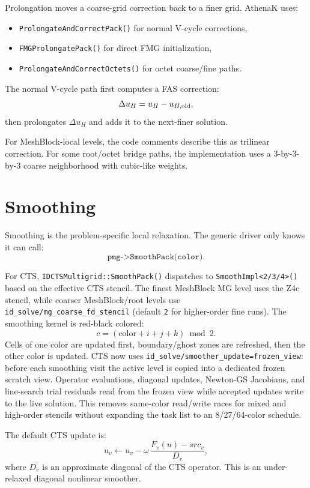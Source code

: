 \documentclass[11pt]{article}
\newcommand{\code}[1]{\texttt{#1}}
\begin{document}
Prolongation moves a coarse-grid correction back to a finer grid.  AthenaK uses:
\begin{itemize}
  \item \code{ProlongateAndCorrectPack()} for normal V-cycle corrections,
  \item \code{FMGProlongatePack()} for direct FMG initialization,
  \item \code{ProlongateAndCorrectOctets()} for octet coarse/fine paths.
\end{itemize}

The normal V-cycle path first computes a FAS correction:
\[
  \Delta u_H = u_H - u_{H,{\rm old}},
\]
then prolongates \(\Delta u_H\) and adds it to the next-finer solution.

For MeshBlock-local levels, the code comments describe this as trilinear
correction.  For some root/octet bridge paths, the implementation uses a
3-by-3-by-3 coarse neighborhood with cubic-like weights.

\section{Smoothing}

Smoothing is the problem-specific local relaxation.  The generic driver only
knows it can call:
\[
  \code{pmg->SmoothPack(color)}.
\]

For CTS, \code{IDCTSMultigrid::SmoothPack()} dispatches to
\code{SmoothImpl<2/3/4>()} based on the effective CTS stencil.  The finest
MeshBlock MG level uses the Z4c stencil, while coarser MeshBlock/root levels use
\code{id\_solve/mg\_coarse\_fd\_stencil} (default \code{2} for higher-order fine
runs).  The smoothing kernel is red-black colored:
\[
  c = (\mathrm{color}+i+j+k)\bmod 2.
\]
Cells of one color are updated first, boundary/ghost zones are refreshed, then
the other color is updated.  CTS now uses
\code{id\_solve/smoother\_update=frozen\_view}: before each smoothing visit the
active level is copied into a dedicated frozen scratch view.  Operator
evaluations, diagonal updates, Newton-GS Jacobians, and line-search trial
residuals read from the frozen view while accepted updates write to the live
solution.  This removes same-color read/write races for mixed and high-order
stencils without expanding the task list to an 8/27/64-color schedule.

The default CTS update is:
\[
  u_v \leftarrow u_v - \omega\,
  \frac{F_v(u)-src_v}{D_v},
\]
where \(D_v\) is an approximate diagonal of the CTS operator.  This is an
under-relaxed diagonal nonlinear smoother.
\end{document}
